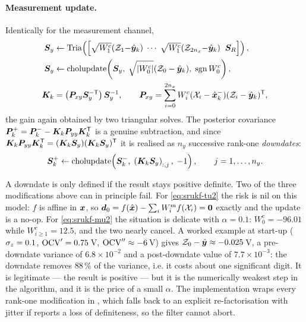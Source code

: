 \paragraph{Measurement update.} Identically for the measurement channel,
\begin{align}
\bm{S}_y &\gets \operatorname{Tria}\!\left(\left[\sqrt{W^c_1}(\mathcal{Z}_1{-}\hat{\bm{y}}_k)\;\cdots\;\sqrt{W^c_1}(\mathcal{Z}_{2n_x}{-}\hat{\bm{y}}_k)\;\;\bm{S}_R\right]\right),
\label{eq:srukf-mu1}\\
\bm{S}_y &\gets \text{cholupdate}\!\left(\bm{S}_y,\;\sqrt{\left\lvert W^c_0 \right\rvert}(\mathcal{Z}_0-\hat{\bm{y}}_k),\;\operatorname{sgn} W^c_0\right),
\label{eq:srukf-mu2}\\
\bm{K}_k &= \left(\bm{P}_{xy}\bm{S}_y^{-\mathsf{T}}\right)\bm{S}_y^{-1}, \qquad
\bm{P}_{xy} = \sum_{i=0}^{2n_x} W^c_i(\mathcal{X}_i-\hat{\bm{x}}^{-}_k)(\mathcal{Z}_i-\hat{\bm{y}}_k)^{\mathsf{T}},
\label{eq:srukf-gain}
\end{align}
the gain again obtained by two triangular solves. The posterior covariance
$\bm{P}^{+}_k = \bm{P}^{-}_k - \bm{K}_k\bm{P}_{yy}\bm{K}_k^{\mathsf{T}}$ is a genuine subtraction, and since
$\bm{K}_k\bm{P}_{yy}\bm{K}_k^{\mathsf{T}} = (\bm{K}_k\bm{S}_y)(\bm{K}_k\bm{S}_y)^{\mathsf{T}}$ it is realised as $n_y$ successive
rank-one \emph{downdates}:
\begin{equation}
\bm{S}^+_k \gets \text{cholupdate}\!\left(\bm{S}^-_k,\; \left(\bm{K}_k\bm{S}_y\right)_{:,j},\; -1\right),
\qquad j = 1,\dots,n_y.
\label{eq:srukf-post}
\end{equation}

\begin{remark}\label{rm:srukf-downdate}
A downdate is only defined if the result stays positive definite. Two of the three
modifications above can in principle fail. For \eqref{eq:srukf-tu2} the risk is nil on this
model: $f$ is affine in $\bm{x}$, so $\bm d_0 = f(\hat{\bm{x}}) - \sum_i W^m_i f(\mathcal{X}_i) = \bm 0$
exactly and the update is a no-op. For \eqref{eq:srukf-mu2} the situation is delicate with
$\alpha=0.1$: $W^c_0 = -96.01$ while $W^c_{i\ge1} = 12.5$, and the two nearly cancel. A
worked example at start-up ($\sigma_z = 0.1$, $\mathrm{OCV}' = 0.75$\,V, $\mathrm{OCV}''\approx-6$\,V)
gives $\mathcal{Z}_0-\hat{\bm{y}} \approx -0.025$\,V, a pre-downdate variance of
$6.8\times10^{-2}$ and a post-downdate value of $7.7\times10^{-3}$: the downdate removes
$88\,\%$ of the variance, i.e. it costs about one significant digit. It is legitimate --- the
result is positive --- but it is the numerically weakest step in the algorithm, and it is the
price of a small $\alpha$. The implementation wraps every rank-one modification in
, which falls back to an explicit re-factorisation with jitter if
 reports a loss of definiteness, so the filter cannot abort.
\end{remark}

